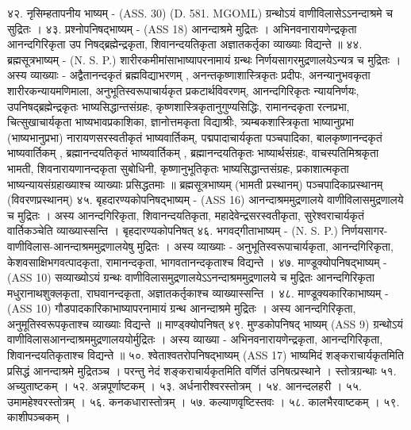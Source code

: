 ४२. नृसिम्हतापनीय भाष्यम् - (ASS. 30)
(D. 581. MGOML) ग्रन्थोऽयं वाणीविलासेऽऽनन्दाश्रमे च सुद्रितः ।
४३. प्रश्नोपनिषद्भाष्यम् - (ASS 18)
आनन्दाश्रमे मुद्रितः । अभिनवनारायणेन्द्रकृता आनन्दगिरिकृता उप निषद्ब्रह्मेन्द्रकृता, शिवानन्दयतिकृता अज्ञातकर्तृका व्याख्याः विद्यन्ते ॥
४४. ब्रह्मसूत्रभाष्यम् - (N. S. P.)
शारीरकमीमांसाभाष्यापरनामायं ग्रन्थः निर्णयसागरमुद्रणालयेऽन्यत्र च मुद्रितः । अस्य व्याख्याः - अद्वैतानन्दकृतं ब्रह्मविद्याभरणम् , अनन्तकृष्णाशास्त्रिकृतः प्रदीपः, अनन्यानुभवकृता शारीरकन्यायमणिमाला, अनुभूतिस्वरूपाचार्यकृत प्रकटार्थविवरणम्, आनन्दगिरिकृतः न्यायनिर्णयः, उपनिषद्ब्रह्मेन्द्रकृतः भाष्यसिद्धान्तसंग्रहः, कृष्णशास्त्रिकृतानुगुण्यसिद्धिः, रामानन्दकृता रत्नप्रभा, चित्सुखाचार्यकृता भाष्यभावप्रकाशिका, ज्ञानोत्तमकृता विद्याश्रीः, त्र्यम्बकशास्त्रिकृता भाष्यानुप्रभा (भाष्यभानुप्रभा) नारायणसरस्वतीकृतं भाष्यवार्तिकम्, पद्मपादाचार्यकृता पञ्चपादिका, बालकृष्णानन्दकृतं भाष्यवार्तिकम् , ब्रह्मानन्दयतिकृतं भाष्यवार्तिकम् , ब्रह्मानन्दयतिकृतः भाष्यार्थसंग्रहः, वाचस्पतिमिश्रकृता भामती, शिवनारायणानन्दकृता सुबोधिनी, कृष्णानुभूतिकृतः भाष्यसिद्धान्तसंग्रहः, प्रकाशात्मकृता भाष्यन्यायसंग्रहाख्याश्च व्याख्याः प्रसिद्धतमाः ॥
ब्रह्मसूत्रभाष्यम् (भामती प्रस्थानम्)
पञ्चपादिकाप्रस्थानम् (विवरणप्रस्थानम्)
४५. बृहदारण्यकोपनिषद्भाष्यम् - (ASS 16)
आनन्दाश्रममुद्रणालये वाणीविलासमुद्रणालये च मुद्रितः । अस्य आनन्दगिरिकृता, शिवानन्दयतिकृता, महादेवेन्द्रसरस्वतीकृता, सुरेश्वराचार्यकृतं वार्तिकञ्चेति व्याख्यास्सन्ति ।
बृहदारण्यकोपनिषत्
४६. भगवद्गीताभाष्यम् - (N. S. P.)
निर्णयसागर-वाणीविलास-आनन्दाश्रममुद्रणालयेषु मुद्रितः । अस्य व्याख्याः - अनुभूतिस्वरूपाचार्यकृता, आनन्दगिरिकृता, केशवसाक्षिभगवत्पादकृता, रामानन्दकृता, भागवतानन्दकृताश्च विद्यन्ते ।
४७. माण्डूक्योपनिषद्भाष्यम् - (ASS 10) 
सव्याख्योऽयं ग्रन्थः वाणीविलासमुद्रणालयेऽऽनन्दाश्रममुद्रणालये च मुद्रितः आनन्दगिरिकृता मधुरानाथशुक्लकृता, राघवानन्दकृता, अज्ञातकर्तृकाश्च व्याख्यास्सन्ति ।
४८. माण्डूक्यकारिकाभाष्यम् - (ASS 10)
गौडपादकारिकाभाष्यापरनामायं ग्रन्थ आनन्दाश्रमे मुद्रितः । अस्य आनन्दगिरिकृता, अनुमूतिस्वरूपकृताश्च व्याख्याः विद्यन्ते ॥
माण्ड्क्योपनिषत्
४९. मुण्डकोपनिषद् भाष्यम् (ASS 9)
ग्रन्थोऽयं वाणीविलासआनन्दाश्रममुद्रणालययोर्मुद्रितः । अस्य व्याख्या - अभिनवनारायणेन्द्रकृता, आनन्दगिरिकृता, शिवानन्दयतिकृताश्च विद्यन्ते ॥
५०. श्वेताश्वतरोपनिषद्भाष्यम् (ASS 17)
भाष्यमिदं शङ्कराचार्यकृतमिति प्रसिद्धं आनन्दाश्रमे मुद्रितञ्च । परन्तु नेदं शङ्कराचार्यकृतमिति वर्णितं उनिषत्प्रस्थाने ।
स्तोत्रग्रन्थाः
५१. अच्युताष्टकम् ।
५२. अन्नपूर्णाष्टकम् ।
५३. अर्धनारीश्वरस्तोत्रम् ।
५४. आनन्दलहरी ।
५५. उमामहेश्वरस्तोत्रम् ।
५६. कनकधारास्तोत्रम् ।
५७. कल्याणवृष्टिस्तवः ।
५८. कालभैरवाष्टकम् ।
५९. काशीपञ्चकम् ।
